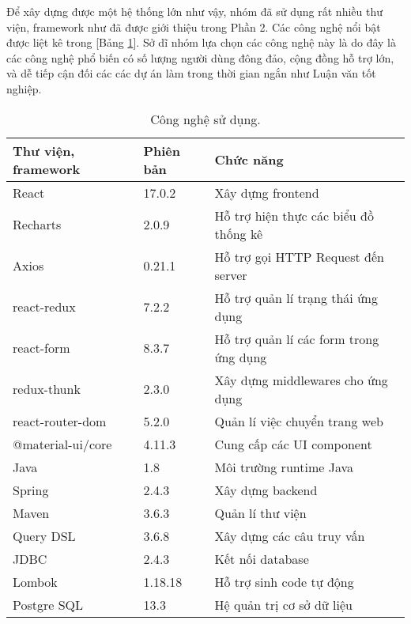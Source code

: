 Để xây dựng được một hệ thống lớn như vậy, nhóm đã sử dụng rất nhiều thư viện, framework như đã được giới thiệu trong Phần 2. Các công nghệ nổi bật được liệt kê trong [Bảng \ref{usedtech}]. Sở dĩ nhóm lựa chọn các công nghệ này là do đây là các công nghệ phổ biến có số lượng người dùng đông đảo, cộng đồng hỗ trợ lớn, và dễ tiếp cận đối các các dự án làm trong thời gian ngắn như Luận văn tốt nghiệp.

\begin{table}[H]
    \centering
    \begin{tabular}{|m{6cm}|m{3cm}|m{6cm}|}
    \hline 
        \textbf{Thư viện, framework} & \textbf{Phiên bản} & \textbf{Chức năng}\\ \hline
        React & 17.0.2 & Xây dựng frontend \\ \hline
        Recharts \cite{rechart} & 2.0.9 & Hỗ trợ hiện thực các biểu đồ thống kê \\ \hline
        Axios & 0.21.1 & Hỗ trợ gọi HTTP Request đến server \\ \hline
        react-redux \cite{redux} & 7.2.2 & Hỗ trợ quản lí trạng thái ứng dụng \\ \hline
        react-form \cite{redux_form} & 8.3.7 & Hỗ trợ quản lí các form trong ứng dụng \\ \hline
        redux-thunk & 2.3.0 & Xây dựng middlewares cho ứng dụng \\ \hline
        react-router-dom & 5.2.0 & Quản lí việc chuyển trang web \\ \hline
        @material-ui/core \cite{materialUI} & 4.11.3 & Cung cấp các UI component \\ \hline
        Java & 1.8 & Môi trường runtime Java \\ \hline
        Spring & 2.4.3 & Xây dựng backend \\ \hline
        Maven & 3.6.3 & Quản lí thư viện \\ \hline
        Query DSL & 3.6.8 & Xây dựng các câu truy vấn \\ \hline
        JDBC & 2.4.3 & Kết nối database \\ \hline
        Lombok & 1.18.18 & Hỗ trợ sinh code tự động \\ \hline
        Postgre SQL & 13.3 & Hệ quản trị cơ sở dữ liệu \\ \hline
    \end{tabular}
    \caption{Công nghệ sử dụng.}
    \label{usedtech}
\end{table}
